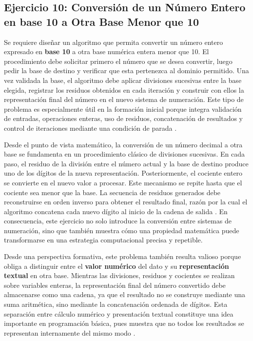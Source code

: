 \documentclass[12pt,twoside]{book}
\begin{document}
			\subsection{Ejercicio 10: Conversión de un Número Entero en base 10 a Otra Base Menor que 10}
				\noindent
				Se requiere diseñar un algoritmo que permita convertir un número entero expresado en \textbf{base 10} a otra base numérica entera menor que 10. El procedimiento debe solicitar primero el número que se desea convertir, luego pedir la base de destino y verificar que esta pertenezca al dominio permitido. Una vez validada la base, el algoritmo debe aplicar divisiones sucesivas entre la base elegida, registrar los residuos obtenidos en cada iteración y construir con ellos la representación final del número en el nuevo sistema de numeración. Este tipo de problema es especialmente útil en la formación inicial porque integra validación de entradas, operaciones enteras, uso de residuos, concatenación de resultados y control de iteraciones mediante una condición de parada \cite{Sebesta2018Concepts,Gaddis2022Starting,Farrell2018Programming}.
				
				Desde el punto de vista matemático, la conversión de un número decimal a otra base se fundamenta en un procedimiento clásico de divisiones sucesivas. En cada paso, el residuo de la división entre el número actual y la base de destino produce uno de los dígitos de la nueva representación. Posteriormente, el cociente entero se convierte en el nuevo valor a procesar. Este mecanismo se repite hasta que el cociente sea menor que la base. La secuencia de residuos generados debe reconstruirse en orden inverso para obtener el resultado final, razón por la cual el algoritmo concatena cada nuevo dígito al inicio de la cadena de salida \cite{Cormen2022Introduction,Sebesta2018Concepts}. En consecuencia, este ejercicio no solo introduce la conversión entre sistemas de numeración, sino que también muestra cómo una propiedad matemática puede transformarse en una estrategia computacional precisa y repetible.
				
				Desde una perspectiva formativa, este problema también resulta valioso porque obliga a distinguir entre el \textbf{valor numérico} del dato y su \textbf{representación textual} en otra base. Mientras las divisiones, residuos y cocientes se realizan sobre variables enteras, la representación final del número convertido debe almacenarse como una cadena, ya que el resultado no se construye mediante una suma aritmética, sino mediante la concatenación ordenada de dígitos. Esta separación entre cálculo numérico y presentación textual constituye una idea importante en programación básica, pues muestra que no todos los resultados se representan internamente del mismo modo \cite{Futschek2006Algorithmic,Qian2018Students,Robins2003Learning,Lister2004Learning}.
				
\end{document}
